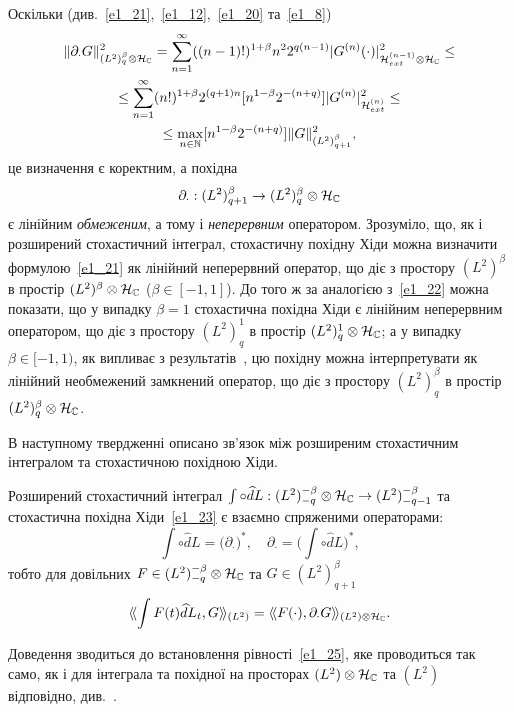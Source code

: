 Оскільки (див.~\eqref{e1_21},~\eqref{e1_12},~\eqref{e1_20} та~\eqref{e1_8})
\begin{equation}\label{e1_22}
\begin{gathered}
\|\partial_\cdot G\|_{(L^2)^\beta_q\otimes\mathcal{H}_{\mathbb{C}}}^2
=\sum_{n=1}^\infty ((n-1)!)^{1+\beta}n^22^{q(n-1)}|G^{(n)}(\cdot)
|_{\mathcal{H}_{ext}^{(n-1)}\otimes\mathcal{H}_{\mathbb{C}}}^2\leq\\
\leq\sum_{n=1}^\infty (n!)^{1+\beta}2^{(q+1)n}[n^{1-\beta}2^{-(n+q)}]
|G^{(n)}|_{\mathcal{H}_{ext}^{(n)}}^2\leq\\
\leq \max\limits_{n\in\mathbb{N}}[n^{1-\beta}2^{-(n+q)}]\|G\|_{(L^2)^\beta_{q+1}}^2,
\end{gathered}
\end{equation}
це визначення є коректним, а похідна
\begin{equation}\label{e1_23}
\partial_\cdot : (L^2)^\beta_{q+1}\to (L^2)^\beta_q\otimes\mathcal{H}_{\mathbb{C}}
\end{equation}
є лінійним {\it обмеженим}, а тому і {\it неперервним} оператором. Зрозуміло, що, як і
розширений стохастичний інтеграл, стохастичну похідну Хіди можна визначити формулою~\eqref{e1_21}
як лінійний неперервний оператор, що діє з простору $(L^2)^\beta$ в простір
$(L^2)^\beta\otimes\mathcal{H}_{\mathbb{C}}$ ($\beta\in [-1,1]$).
До того ж за аналогією з~\eqref{e1_22} можна показати, що у випадку $\beta=1$ стохастична
похідна Хіди є лінійним неперервним оператором, що діє з простору $(L^2)^1_q$ в простір
$(L^2)^1_q\otimes\mathcal{H}_{\mathbb{C}}$; а у випадку $\beta\in [-1,1)$, як випливає з
результатів~\cite{K13_2}, цю похідну можна інтерпретувати як лінійний необмежений замкнений
оператор, що діє з простору $(L^2)^\beta_q$ в простір
$(L^2)^\beta_q\otimes\mathcal{H}_{\mathbb{C}}$.

В наступному твердженні описано зв'язок між розширеним стохастичним інтегралом та стохастичною
похідною Хіди.
\begin{subtheorem}\label{t1_5_1}
Розширений стохастичний інтеграл
$\int\circ\widehat d L:
(L^2)^{-\beta}_{-q}\otimes\mathcal{H}_{\mathbb{C}}\to (L^2)^{-\beta}_{-q-1}$
та стохастична похідна Хіди~\eqref{e1_23} є взаємно спряженими операторами:
\begin{equation}\label{e1_24}
\int\circ\widehat d L=\big(\partial_\cdot\big)^*,
\quad
\partial_\cdot=\big(\int\circ\widehat d L\big)^*,
\end{equation}
тобто для довільних $F\in (L^2)^{-\beta}_{-q}\otimes\mathcal{H}_{\mathbb{C}}$ та
$G\in (L^2)^\beta_{q+1}$
\begin{equation}\label{e1_25}
\langle\!\langle\int F(t)\widehat d L_t,G\rangle\!\rangle_{(L^2)}
=\langle\!\langle F(\cdot),\partial_\cdot G\rangle\!\rangle_{(L^2)\otimes\mathcal{H}_{\mathbb{C}}}.
\end{equation}
\end{subtheorem}
Доведення зводиться до встановлення рівності~\eqref{e1_25}, яке проводиться так само,
як і для інтеграла та похідної на просторах $(L^2)\otimes\mathcal{H}_{\mathbb{C}}$ та
$(L^2)$ відповідно, див.~\cite{K13}.

